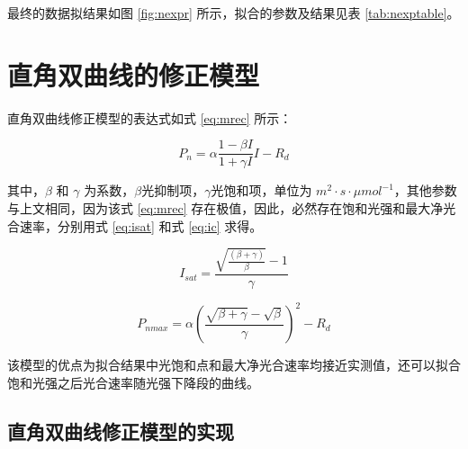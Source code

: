 \documentclass[
]{krantz}
\begin{document}
最终的数据拟结果如图 \ref{fig:nexpr} 所示，拟合的参数及结果见表 \ref{tab:nexptable}。

\cleardoublepage

\hypertarget{rev_rec}{%
\section{直角双曲线的修正模型}\label{rev_rec}}

\citet{YEZiPiao2010} 直角双曲线修正模型的表达式如式 \eqref{eq:mrec} 所示：

\begin{equation}
P_{n} = \alpha \frac{1-\beta I}{1+\gamma I} I - R_{d}
\label{eq:mrec}
\end{equation}

其中，\(\beta\) 和 \(\gamma\) 为系数，\(\beta\)光抑制项，\(\gamma\)光饱和项，单位为
\(m^{2}\cdot s\cdot\mu mol^{-1}\)，其他参数与上文相同，因为该式 \eqref{eq:mrec}
存在极值，因此，必然存在饱和光强和最大净光合速率，分别用式 \eqref{eq:isat} 和式 \eqref{eq:ic} 求得。

\begin{equation}
I_{sat} = \frac{\sqrt{\frac{(\beta+\gamma)}{\beta}} - 1}{\gamma}
\label{eq:isat}
\end{equation}

\begin{equation}
P_{nmax} = \alpha\left(\frac{\sqrt{\beta+\gamma}-\sqrt{\beta}}{\gamma}\right)^{2}-R_{d}
\label{eq:ic}
\end{equation}

该模型的优点为拟合结果中光饱和点和最大净光合速率均接近实测值，还可以拟合饱和光强之后光合速率随光强下降段的曲线。

\hypertarget{rev_rec_exam}{%
\subsection{直角双曲线修正模型的实现}\label{rev_rec_exam}}
\end{document}

